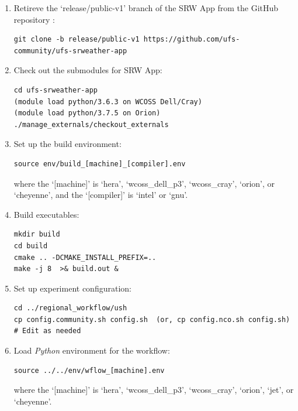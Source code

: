 \documentclass[11pt,fleqn]{report}              %
\begin{document}
\begin{enumerate}
\item Retireve the `release/public-v1' branch of the SRW App from the GitHub repository :
\lstset{language=bash}   
\begin{lstlisting}[frame=trBL]
git clone -b release/public-v1 https://github.com/ufs-community/ufs-srweather-app
\end{lstlisting}
 
\item Check out the submodules for SRW App:
\lstset{language=bash}   
\begin{lstlisting}[frame=trBL]
cd ufs-srweather-app
(module load python/3.6.3 on WCOSS Dell/Cray)
(module load python/3.7.5 on Orion)
./manage_externals/checkout_externals
\end{lstlisting}

\item Set up the build environment:
\lstset{language=bash}   
\begin{lstlisting}[frame=trBL]
source env/build_[machine]_[compiler].env
\end{lstlisting}
where the `[machine]' is `hera', `wcoss\_dell\_p3', `wcoss\_cray', `orion', or `cheyenne', and the `[compiler]' is `intel' or `gnu'.

\vspace{0.2cm}

\item Build executables:
\lstset{language=bash}   
\begin{lstlisting}[frame=trBL]
mkdir build
cd build
cmake .. -DCMAKE_INSTALL_PREFIX=..
make -j 8  >& build.out &
\end{lstlisting}


\item Set up experiment configuration:
\lstset{language=bash}   
\begin{lstlisting}[frame=trBL]
cd ../regional_workflow/ush
cp config.community.sh config.sh  (or, cp config.nco.sh config.sh)
# Edit as needed
\end{lstlisting}


\item Load {\it Python} environment for the workflow:

\lstset{language=bash}   
\begin{lstlisting}[frame=trBL]
source ../../env/wflow_[machine].env
\end{lstlisting}
where the `[machine]' is `hera', `wcoss\_dell\_p3', `wcoss\_cray', `orion', `jet', or `cheyenne'. 


\end{enumerate}
\end{document}
